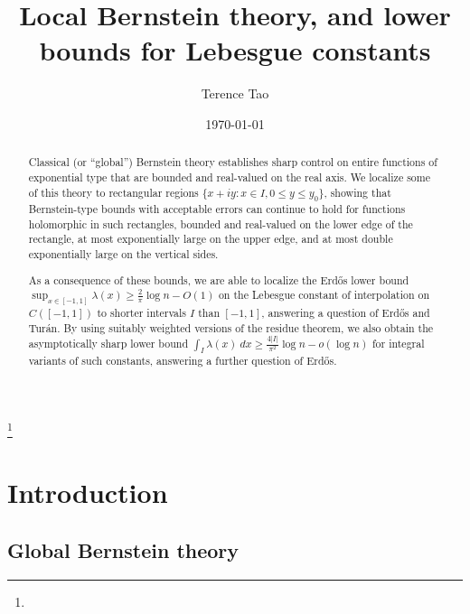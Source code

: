 \documentclass[12pt]{amsart}
\begin{document}

\title{Local Bernstein theory, and lower bounds for Lebesgue constants}


\author{Terence Tao}
\address{UCLA Department of Mathematics, Los Angeles, CA 90095-1555.}

\keywords{}
\thanks{}


\date{\today}

\begin{abstract} Classical (or ``global'') Bernstein theory establishes sharp control on entire functions of exponential type that are bounded and real-valued on the real axis.  We localize some of this theory to rectangular regions $\{ x+iy: x \in I, 0 \leq y \leq y_0 \}$, showing that Bernstein-type bounds with acceptable errors can continue to hold for functions holomorphic in such rectangles, bounded and real-valued on the lower edge of the rectangle, at most exponentially large on the upper edge, and at most double exponentially large on the vertical sides.

As a consequence of these bounds, we are able to localize the Erd\H{o}s lower bound  $\sup_{x \in [-1,1]} \lambda(x) \geq \frac{2}{\pi} \log n - O(1)$ on the Lebesgue constant of interpolation on $C([-1,1])$ to shorter intervals $I$ than $[-1,1]$, answering a question of Erd\H{o}s and Tur\'an.  By using suitably weighted versions of the residue theorem, we also obtain the asymptotically sharp lower bound $\int_I \lambda(x)\ dx \geq \frac{4|I|}{\pi^2} \log n - o(\log n)$ for integral variants of such constants, answering a further question of Erd\H{o}s.
\end{abstract}

\maketitle








\section{Introduction}

\subsection{Global Bernstein theory}
\end{document}
